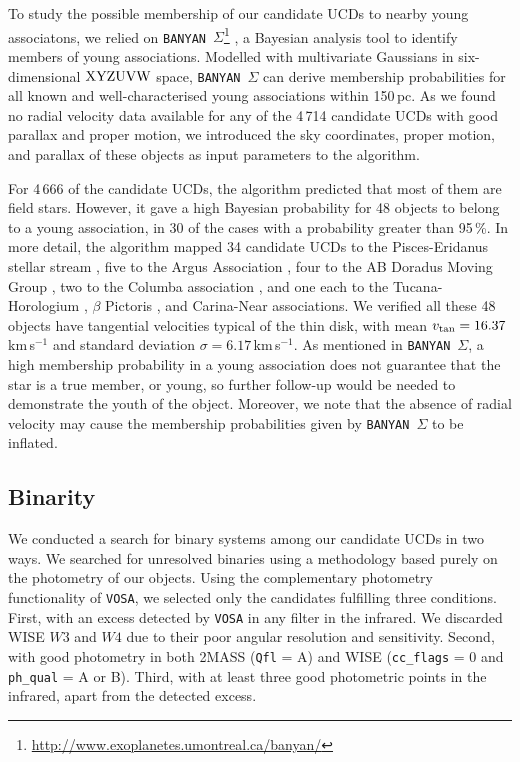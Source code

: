 To study the possible membership of our candidate UCDs to nearby young associatons, we relied on \texttt{BANYAN}~$\Sigma$\footnote{\url{http://www.exoplanetes.umontreal.ca/banyan/}} \citep{banyan}, a Bayesian analysis tool to identify members of young associations. Modelled with multivariate Gaussians in six-dimensional $\rm XYZUVW$ space, \texttt{BANYAN}~$\Sigma$ can derive membership probabilities for all known and well-characterised young associations within 150\,pc. As we found no radial velocity data available for any of the 4\,714 candidate UCDs with good parallax and proper motion, we introduced the sky coordinates, proper motion, and parallax of these objects as input parameters to the algorithm.

For 4\,666 of the candidate UCDs, the algorithm predicted that most of them are field stars. However, it gave a high Bayesian probability for 48 objects to belong to a young association, in 30 of the cases with a probability greater than 95\,\%. In more detail, the algorithm mapped 34 candidate UCDs to the Pisces-Eridanus stellar stream \citep{PERI}, five to the Argus Association \citep{argus}, four to the AB Doradus Moving Group \citep{abdmg}, two to the Columba association \citep{columba}, and one each to the Tucana-Horologium \citep{tha}, $\beta$ Pictoris \citep{bpictoris}, and Carina-Near \citep{carn} associations. We verified all these 48 objects have tangential velocities typical of the thin disk, with mean $v_{\rm tan}=16.37$\,km\,s$^{-1}$ and standard deviation $\sigma = 6.17$\,km\,s$^{-1}$. As mentioned in \texttt{BANYAN}~$\Sigma$, a high membership probability in a young association does not guarantee that the star is a true member, or young, so further follow-up would be needed to demonstrate the youth of the object. Moreover, we note that the absence of radial velocity may cause the membership probabilities given by \texttt{BANYAN}~$\Sigma$ to be inflated.

\subsection{Binarity} \label{binarity}

We conducted a search for binary systems among our candidate UCDs in two ways. We searched for unresolved binaries using a methodology based purely on the photometry of our objects. Using the complementary photometry functionality of \texttt{VOSA}, we selected only the candidates fulfilling three conditions. First, with an excess detected by \texttt{VOSA} in any filter in the infrared. We discarded WISE $W3$ and $W4$ due to their poor angular resolution and sensitivity. Second, with good photometry in both 2MASS (\texttt{Qfl} = A) and WISE (\texttt{cc\_flags} = 0 and \texttt{ph\_qual} = A or B). Third, with at least three good photometric points in the infrared, apart from the detected excess.

